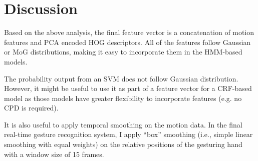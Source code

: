 \section{Discussion}
Based on the above analysis, the final feature vector is a concatenation of
motion features and PCA encoded HOG descriptors. All of the features follow
Gaussian or MoG distributions, making it easy to incorporate them in the HMM-based models.

The probability output from an SVM does not follow Gaussian distribution. 
However, it might be useful to use it as part of a feature vector for a
CRF-based model as those models have greater flexibility to incorporate features
(e.g. no CPD is required).

It is also useful to apply temporal smoothing on the motion data. In the final
real-time gesture recognition system, I apply ``box'' smoothing (i.e., simple
linear smoothing with equal weights) on the relative positions of the gesturing hand with a window size of 15 frames.
